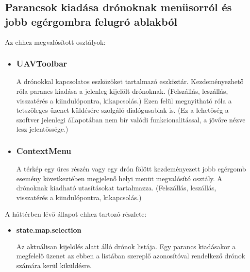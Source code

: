 \subsection{Parancsok kiadása drónoknak menüsorról és jobb egérgombra felugró ablakból}

\noindent Az ehhez megvalósított osztályok:
\begin{itemize}


\item\subsubsection{UAVToolbar}
A drónokkal kapcsolatos eszközöket tartalmazó eszköztár. Kezdeményezhető róla
parancs kiadása a jelenleg kijelölt drónoknak. (Felszállás, leszállás,
visszatérés a kiindulópontra, kikapcsolás.) Ezen felül megnyitható róla a
tetszőleges üzenet küldésére szolgáló dialógusablak is. (Ez a lehetőség a
szoftver jelenlegi állapotában nem bír valódi funkcionalitással, a jövőre nézve
lesz jelentőssége.)

\item\subsubsection{ContextMenu}
A térkép egy üres részén vagy egy drón fölött kezdeményezett jobb egérgomb
esemény következtében megjelenő helyi menüt megvalósító osztály. A drónoknak
kiadható utasításokat tartalmazza. (Felszállás, leszállás, visszatérés a
kiindulópontra, kikapcsolás.)

\end{itemize}

\noindent A háttérben lévő állapot ehhez tartozó részlete:
\begin{itemize}

  \item \textbf{state.map.selection}

  Az aktuálisan kijelölés alatt álló drónok listája. Egy parancs kiadásakor a
  megfelelő üzenet az ebben a listában szereplő azonosítóval rendelkező drónok
  számára kerül kiküldésre.

\end{itemize}

